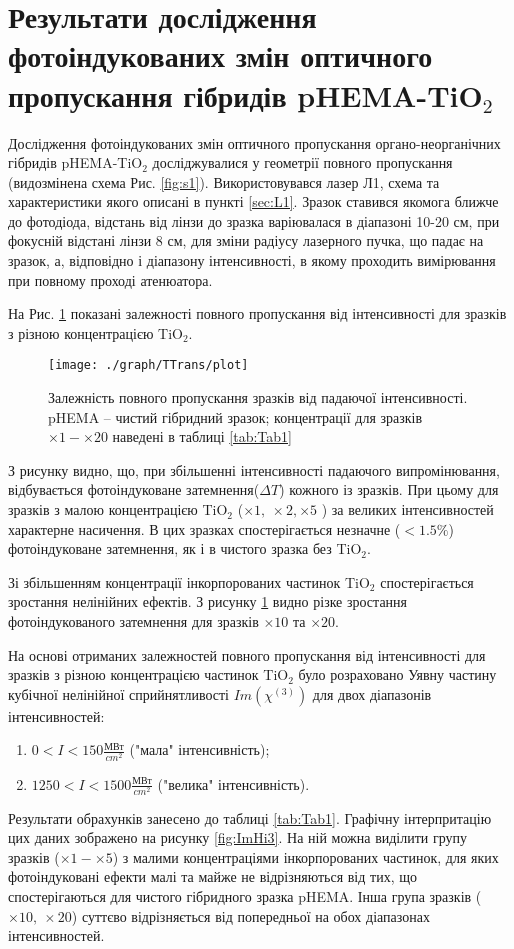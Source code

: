 \section{Результати дослідження фотоіндукованих змін оптичного пропускання гібридів pHEMA-TiO$_2$}

Дослідження фотоіндукованих змін оптичного пропускання органо-неорганічних гібридів pHEMA-TiO$_2$
досліджувалися у геометрії повного пропускання (видозмінена схема Рис. \ref{fig:s1}).
Використовувався лазер Л1, схема та характеристики якого описані в пункті \ref{sec:L1}. Зразок ставився якомога ближче до фотодіода, відстань
від лінзи до зразка варіювалася в діапазоні 10-20 см, при фокусній відстані лінзи 8
см, для зміни радіусу лазерного пучка, що падає на зразок, а, відповідно і діапазону
інтенсивності, в якому проходить вимірювання при повному проході атенюатора.

На Рис. \ref{fig:TTrans} показані залежності повного пропускання від інтенсивності для
зразків з різною концентрацією TiO$_2$.

\begin{figure}
\centering
\texttt{[image: ./graph/TTrans/plot]}
\caption{Залежність повного пропускання зразків від падаючої
інтенсивності. pHEMA -- чистий гібридний зразок; концентрації для зразків $\times1 - \times20$ наведені в таблиці \ref{tab:Tab1}}\label{fig:TTrans}
\end{figure}

З рисунку видно, що, при збільшенні інтенсивності падаючого випромінювання, відбувається фотоіндуковане затемнення($\Delta T$) кожного із зразків. 
При цьому для зразків з малою концентрацією TiO$_2$ ($\times1, ~\times2,\times5$ ) за великих інтенсивностей характерне насичення. В цих зразках спостерігається незначне ($<1.5\%$) фотоіндуковане затемнення, як і в чистого зразка без TiO$_2$.

Зі збільшенням концентрації інкорпорованих частинок TiO$_2$ спостерігається зростання нелінійних ефектів. З рисунку \ref{fig:TTrans} видно різке зростання фотоіндукованого затемнення для зразків $\times10$ та $\times20$.

На основі отриманих залежностей повного пропускання від інтенсивності для зразків з різною концентрацією частинок TiO$_2$ було розраховано Уявну частину кубічної нелінійної сприйнятливості $Im(\chi^{(3)})$ для двох діапазонів інтенсивностей:
\begin{enumerate}
\item $0 < I <150 \frac{\textbf{МВт}}{cm^2}$ ("мала" інтенсивність);
\item $1250 < I <1500 \frac{\textbf{МВт}}{cm^2}$ ("велика" інтенсивність).
\end{enumerate}
Результати обрахунків занесено до таблиці \ref{tab:Tab1}. Графічну інтерпритацію цих даних зображено на рисунку \ref{fig:ImHi3}. На ній можна виділити групу зразків ($\times1 - \times5$) з малими концентраціями інкорпорованих частинок, для яких фотоіндуковані ефекти малі та майже не відрізняються від тих, що спостерігаються для чистого гібридного зразка pHEMA. Інша група зразків ($\times10, ~ \times20$) суттєво відрізняється від попередньої на обох діапазонах інтенсивностей.




